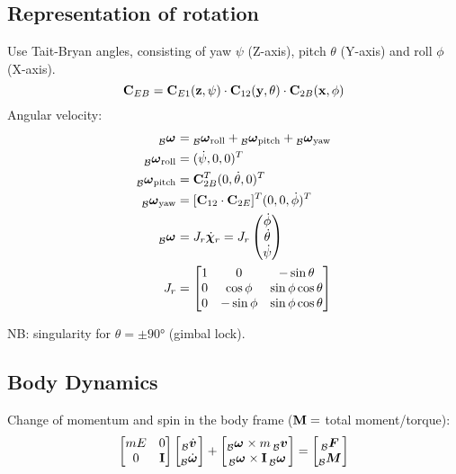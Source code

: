 \documentclass[a4paper, 8pt]{extarticle}
\newcommand{\mvec}[3]{  \prescript{}{\mathcal{#1}}{\bm{#2}}  _{#3} }
\newcommand{\mdvec}[3]{ \prescript{}{\mathcal{#1}}{\dot{\bm #2}} _{#3} }
\begin{document}
\begin{multicols*}{3}
\subsection*{Representation of rotation}

Use Tait-Bryan angles, consisting of yaw $\psi$ (Z-axis), pitch $\theta$ (Y-axis) and roll $\phi$ (X-axis). 
$${\bf C}_{EB} = {\bf C}_{E1}({\bf z}, \psi) \cdot {\bf C}_{12}({\bf y}, \theta) \cdot {\bf C}_{2B}({\bf x}, \phi)$$
Angular velocity:
\begin{align*}
\mvec{B}{\omega}{} &= \mvec{B}{\omega}{\text{roll}} + \mvec{B}{\omega}{\text{pitch}} + \mvec{B}{\omega}{\text{yaw}}\\
\mvec{B}{\omega}{\text{roll}} &= (\dot\psi, 0, 0)^T\\
\mvec{B}{\omega}{\text{pitch}} &= {\bf C}_{2B}^T(0,\dot\theta, 0)^T\\
\mvec{B}{\omega}{\text{yaw}} &= [{\bf C}_{12}\cdot {\bf C}_{2E}]^T (0, 0, \dot\phi)^T \\
\mvec{B}{\omega}{} &= J_r\dot{\bm \chi}_r = J_r \begin{pmatrix}
\dot\phi\\
\dot\theta\\
\dot\psi
\end{pmatrix} \\
J_r &= \begin{bmatrix}
1 & 0 & -\sin\theta \\
0 & \cos\phi  &  \sin\phi\cos\theta \\
0 & -\sin\phi  &  \sin\phi\cos\theta
\end{bmatrix}
\end{align*}

NB: singularity for $\theta = \pm \ang{90}$ (gimbal lock).


\subsection*{Body Dynamics}
Change of momentum and spin in the body frame (${\bf M} = $ total moment/torque):
$$\begin{bmatrix}
mE & 0\\
0 & {\bf I}
\end{bmatrix}\begin{bmatrix}
\mdvec{B}{v}{} \\
\mdvec{B}{\omega}{}
\end{bmatrix} + \begin{bmatrix}
\mvec{B}{\omega}{} \times m \mvec{B}{v}{} \\
\mvec{B}{\omega}{} \times {\bf I}\mvec{B}{\omega}{}
\end{bmatrix} = \begin{bmatrix}
\mvec{B}{F}{}\\ \mvec{B}{M}{}
\end{bmatrix}
$$


\end{multicols*}
\end{document}
